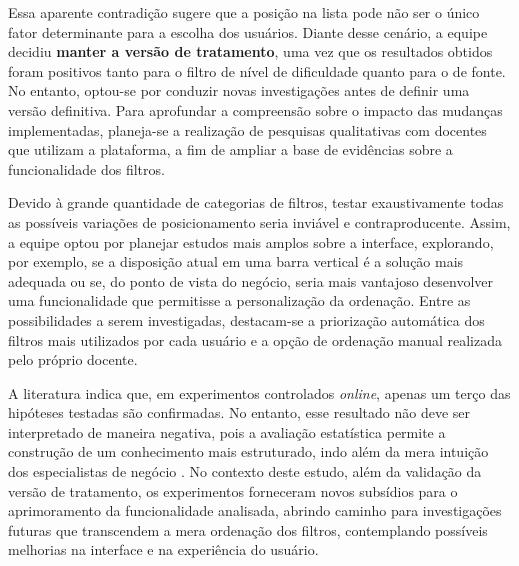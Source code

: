 Essa aparente contradição sugere que a posição na lista pode não ser o único fator determinante para a escolha dos usuários. Diante desse cenário, a equipe decidiu \textbf{manter a versão de tratamento}, uma vez que os resultados obtidos foram positivos tanto para o filtro de nível de dificuldade quanto para o de fonte. No entanto, optou-se por conduzir novas investigações antes de definir uma versão definitiva. Para aprofundar a compreensão sobre o impacto das mudanças implementadas, planeja-se a realização de pesquisas qualitativas com docentes que utilizam a plataforma, a fim de ampliar a base de evidências sobre a funcionalidade dos filtros.  

Devido à grande quantidade de categorias de filtros, testar exaustivamente todas as possíveis variações de posicionamento seria inviável e contraproducente. Assim, a equipe optou por planejar estudos mais amplos sobre a interface, explorando, por exemplo, se a disposição atual em uma barra vertical é a solução mais adequada ou se, do ponto de vista do negócio, seria mais vantajoso desenvolver uma funcionalidade que permitisse a personalização da ordenação. Entre as possibilidades a serem investigadas, destacam-se a priorização automática dos filtros mais utilizados por cada usuário e a opção de ordenação manual realizada pelo próprio docente.  

A literatura indica que, em experimentos controlados \textit{online}, apenas um terço das hipóteses testadas são confirmadas. No entanto, esse resultado não deve ser interpretado de maneira negativa, pois a avaliação estatística permite a construção de um conhecimento mais estruturado, indo além da mera intuição dos especialistas de negócio \cite{kohavi_oce_and_ab_tests_2017, erthal_characterization_2023}. No contexto deste estudo, além da validação da versão de tratamento, os experimentos forneceram novos subsídios para o aprimoramento da funcionalidade analisada, abrindo caminho para investigações futuras que transcendem a mera ordenação dos filtros, contemplando possíveis melhorias na interface e na experiência do usuário.  

